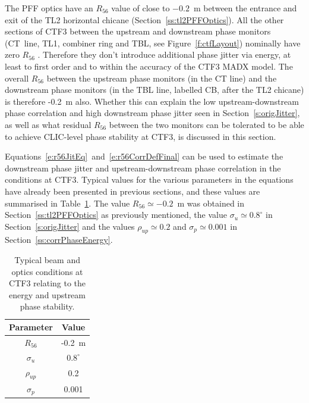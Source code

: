 The PFF optics have an \(R_{56}\) value of close to \(-0.2\)~m between the entrance and exit of the TL2 horizontal chicane (Section~\ref{ss:tl2PFFOptics}).
All the other sections of CTF3 between the upstream and downstream phase monitors (CT~line, TL1, combiner ring and TBL, see Figure~\ref{f:ctfLayout}) nominally have zero \(R_{56}\) \cite{CTF3}. Therefore they don't introduce additional phase jitter via energy, at least to first order and to within the accuracy of the CTF3 MADX model. The overall \(R_{56}\) between the upstream phase monitors (in the CT line) and the downstream phase monitors (in the TBL line, labelled CB, after the TL2 chicane) is therefore -0.2~m also. Whether this can explain the low upstream-downstream phase correlation and high downstream phase jitter seen in Section~\ref{s:origJitter}, as well as what residual \(R_{56}\) between the two monitors can be tolerated to be able to achieve CLIC-level phase stability at CTF3, is discussed in this section.

Equations~\ref{e:r56JitEq}~and~\ref{e:r56CorrDefFinal} can be used to estimate the downstream phase jitter and upstream-downstream phase correlation in the conditions at CTF3. Typical values for the various parameters in the equations have already been presented in previous sections, and these values are summarised in Table~\ref{t:r56Params}. The value \(R_{56}\simeq -0.2\)~m was obtained in Section~\ref{ss:tl2PFFOptics} as previously mentioned, the value \(\sigma_u\simeq0.8^\circ\) in Section~\ref{s:origJitter} and the values \(\rho_{up}\simeq 0.2\) and \(\sigma_p\simeq 0.001\) in Section~\ref{ss:corrPhaseEnergy}.

\begin{table}
  \begin{center}
    \begin{tabular}{| c c |}
	   \hline
       Parameter & Value \\ \hline
       \(R_{56}\) & -0.2~m \\
       \(\sigma_u\) & \(0.8^\circ\) \\
       \(\rho_{up}\) & 0.2 \\
       \(\sigma_{p}\) & 0.001 \\ \hline
    \end{tabular}
    \caption{Typical beam and optics conditions at CTF3 relating to the energy and upstream phase stability.}
  	\label{t:r56Params}
  \end{center}
\end{table}




